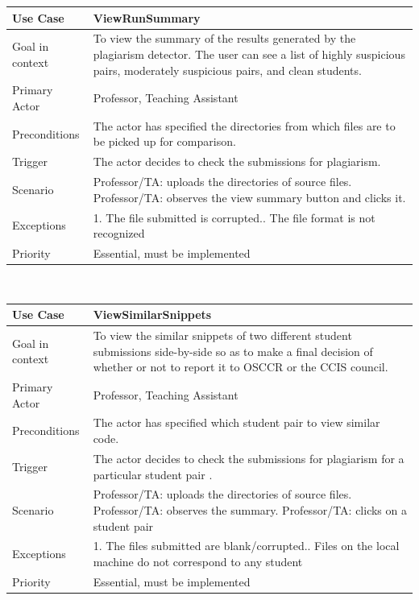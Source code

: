 \documentclass[12pt]{article}
\begin{document}
\begin{tabular}{ |p{3cm}||p{11.25cm}| }
 \hline
 \textbf{Use Case} & \textbf{ViewRunSummary}\\
 \hline
 Goal in context & To view the summary of the results generated by the plagiarism detector. The user can see a list of highly suspicious pairs, moderately suspicious pairs, and clean students.\\
 \hline
 Primary Actor & Professor, Teaching Assistant \\
 \hline
 Preconditions& The actor has specified the directories from which files are to be picked up for comparison. \\
 \hline
 Trigger &The actor decides to check the submissions for plagiarism.\\
 \hline
 Scenario    &Professor/TA: uploads the directories of source files.\newline
Professor/TA: observes the view summary button and clicks it.\\
\hline
 Exceptions&  
1. The file submitted is corrupted.\newline
2. The file format is not recognized 
\\
\hline
 Priority& Essential, must be implemented \\
 \hline
\end{tabular} \\[2.0 em]


\begin{tabular}{ |p{3cm}||p{11.25cm}| }
 \hline
 \textbf{Use Case} & \textbf{ViewSimilarSnippets}\\
 \hline
 Goal in context & To view the similar snippets of two different student submissions side-by-side so as to make a final decision of whether or not to report it to OSCCR or the CCIS council.\\
 \hline
 Primary Actor & Professor, Teaching Assistant \\
 \hline
 Preconditions& The actor has specified which student pair to view similar code.\\
 \hline
 Trigger &The actor decides to check the submissions for plagiarism for a particular student pair .\\
 \hline
 Scenario    &Professor/TA: uploads the directories of source files.\newline
Professor/TA: observes the summary.\newline
Professor/TA: clicks on a student pair\\
\hline
 Exceptions&  
1. The files submitted are blank/corrupted.\newline
2. Files on the local machine do not correspond to any student
\\
\hline
 Priority& Essential, must be implemented \\
 \hline
\end{tabular} \\[2.0 em]
\end{document}
